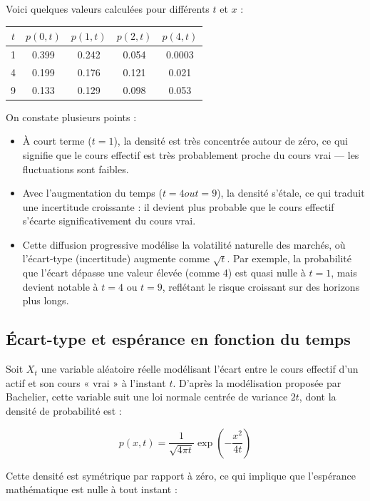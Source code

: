 \documentclass[12pt,a4paper]{article}
\begin{document}
Voici quelques valeurs calculées pour différents \( t \) et \( x \) :

\begin{center}
\begin{tabular}{c|cccc}
\hline
\( t \) & \( p(0,t) \) & \( p(1,t) \) & \( p(2,t) \) & \( p(4,t) \) \\
\hline
1 & 0.399 & 0.242 & 0.054 & 0.0003 \\
4 & 0.199 & 0.176 & 0.121 & 0.021 \\
9 & 0.133 & 0.129 & 0.098 & 0.053 \\
\hline
\end{tabular}
\end{center}

On constate plusieurs points :
\begin{itemize}
  \item À court terme (\( t=1 \)), la densité est très concentrée autour de zéro, ce qui signifie que le cours effectif est très probablement proche du cours vrai — les fluctuations sont faibles.
  \item Avec l’augmentation du temps (\( t=4 ou t=9 \)), la densité s’étale, ce qui traduit une incertitude croissante : il devient plus probable que le cours effectif s’écarte significativement du cours vrai.
  \item Cette diffusion progressive modélise la volatilité naturelle des marchés, où l’écart-type (incertitude) augmente comme \(\sqrt{t}\). Par exemple, la probabilité que l’écart dépasse une valeur élevée (comme 4) est quasi nulle à \( t=1 \), mais devient notable à \( t=4 \) ou \( t=9 \), reflétant le risque croissant sur des horizons plus longs.
\end{itemize}

\subsection{Écart-type et espérance en fonction du temps}

Soit \( X_t \) une variable aléatoire réelle modélisant l’écart entre le cours effectif d’un actif et son cours « vrai » à l’instant \( t \). D’après la modélisation proposée par Bachelier, cette variable suit une loi normale centrée de variance \( 2t \), dont la densité de probabilité est :

\[
p(x,t) = \frac{1}{\sqrt{4\pi t}} \exp\left(-\frac{x^2}{4t}\right)
\]

Cette densité est symétrique par rapport à zéro, ce qui implique que l’espérance mathématique est nulle à tout instant :
\end{document}
